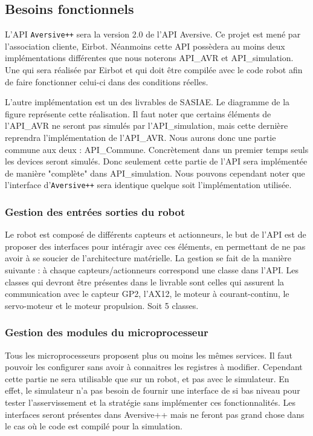 \subsection{Besoins fonctionnels}

L'API \texttt{Aversive++} sera la version 2.0 de l'API Aversive. Ce projet est mené par l'association cliente, Eirbot. Néanmoins cette API possèdera au moins deux implémentations différentes que nous noterons API_AVR et API_simulation. Une qui sera réalisée par Eirbot et qui doit être compilée avec le code robot afin de faire fonctionner celui-ci dans des conditions réelles. 

L'autre implémentation est un des livrables de SASIAE. Le diagramme de la figure
représente cette réalisation. Il faut noter que certains éléments de l'API_AVR ne seront pas simulés par l'API_simulation, mais cette dernière reprendra l'implémentation de l'API_AVR. Nous aurons donc une partie commune aux deux : API_Commune. 
Concrètement dans un premier temps seuls les devices seront simulés. Donc seulement cette partie de l'API sera implémentée de manière "complète" dans API_simulation. Nous pouvons cependant noter que l'interface d'\texttt{Aversive++} sera %
identique quelque soit l'implémentation utilisée.

\subsubsection{Gestion des entrées sorties du robot}

Le robot est composé de différents capteurs et actionneurs, le but de l'API est de proposer des interfaces pour intéragir avec ces éléments, en permettant de ne pas avoir à se soucier de l'architecture matérielle. La gestion se fait de la manière suivante : à chaque capteurs/actionneurs correspond une classe dans l'API. Les classes qui devront être présentes dans le livrable sont celles qui assurent la communication avec le capteur GP2, l'AX12, le moteur à courant-continu, le servo-moteur et le moteur propulsion.
Soit 5 classes.

\subsubsection{Gestion des modules du microprocesseur}

Tous les microprocesseurs proposent plus ou moins les mêmes services. Il faut pouvoir les configurer sans avoir à connaitres les registres à modifier. Cependant cette partie ne sera utilisable que sur un robot, et pas avec le simulateur. En effet, le simulateur n'a pas besoin de fournir une interface de si bas niveau pour tester l'asservissement et la stratégie sans implémenter ces fonctionnalités. Les interfaces seront présentes dans Aversive++ mais ne feront pas grand chose dans le cas où le code est compilé pour la simulation.

